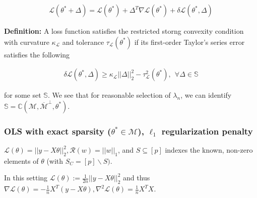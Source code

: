 \documentclass[11pt]{article}
\begin{document}
\begin{gather*}
    \mathcal{L}(\theta^* + \Delta)
    =
    \mathcal{L}(\theta^*)
    +
    \Delta^T\nabla\mathcal{L}(\theta^*)
    +
    \delta \mathcal{L}(\theta^*, \Delta)
\end{gather*}

%

{\bf Definition:} A loss function satisfies the restricted storng convexity condition with curvature $\kappa_\mathcal{L}$ and tolerance $\tau_{\mathcal{L}}(\theta^*)$ if its first-order Taylor's series error satisfies the following

\begin{gather*}
    \delta \mathcal{L}(\theta^*, \Delta)
    \geq \kappa_\mathcal{L}||\Delta||_2^2 - \tau^2_\mathcal{L}(\theta^*), \ \ \forall \Delta \in \mathbb{S}
\end{gather*}

for some set $\mathbb{S}$. We see that for reasonable selection of $\lambda_n$, we can identify $\mathbb{S}=\mathbb{C}(\mathcal{M}, \overline{\mathcal{M}}^\perp, \theta^*)$.

\subsubsection{OLS  with exact sparsity ($\theta^* \in \mathcal{M}$), $\ell_1$ regularization penalty}
  
$\mathcal{L}(\theta) = ||y-X\theta||_2^2, \mathcal{R}(w) = ||w||_1$, and $S \subseteq[p]$ indexes the known, non-zero elements of $\theta$ (with $S_C = [p]\backslash S)$. \newline 

In this setting $\mathcal{L}(\theta) := \frac{1}{2n}||y-X\theta||_2^2$ and thus $\nabla\mathcal{L}(\theta) = -\frac{1}{n}X^T(y-X\theta), \nabla^2\mathcal{L}(\theta) = \frac{1}{n}X^TX$. \newline 
\end{document}
